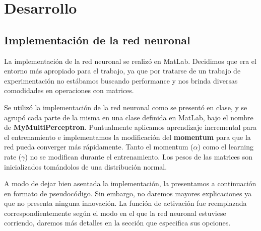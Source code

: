 \documentclass[informe.tex]{subfiles}
\begin{document}
  
  \section{Desarrollo}
  
  \subsection{Implementación de la red neuronal}
    La implementación de la red neuronal se realizó en MatLab. Decidimos que era el entorno más apropiado para el trabajo, ya que por tratarse de un trabajo de experimentación no estábamos buscando performance y nos brinda diversas comodidades en operaciones con matrices. 
    
    Se utilizó la implementación de la red neuronal como se presentó en clase, y se agrupó cada parte de la misma en una clase definida en MatLab, bajo el nombre de \textbf{MyMultiPerceptron}. Puntualmente aplicamos aprendizaje incremental para el entrenamiento e implementamos la modificación del \textbf{momentum} para que la red pueda converger más rápidamente. Tanto el momentum ($\alpha$) como el learning rate ($\gamma$) no se modifican durante el entrenamiento. Los pesos de las matrices son inicializados tom\'andolos de una distribuci\'on normal.
    
    A modo de dejar bien asentada la implementación, la presentamos a continuación en formato de pseudocódigo. Sin embargo, no daremos mayores explicaciones ya que no presenta ninguna innovación. La función de activación fue reemplazada correspondientemente según el modo en el que la red neuronal estuviese corriendo, daremos más detalles en la sección que especifica sus opciones.
  
    \vspace{15pt}
    
\end{document}
